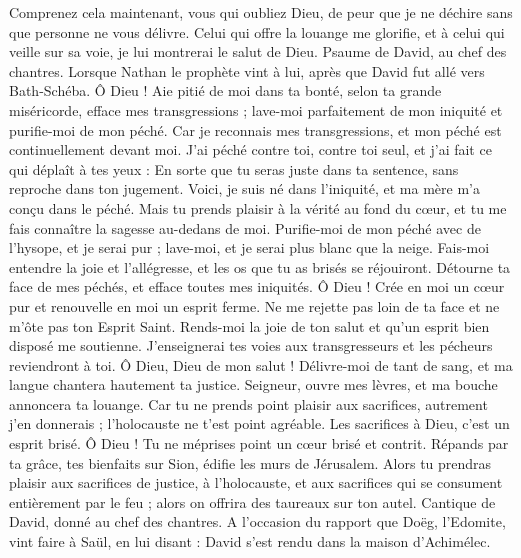 \begin{multicols}{2}
Comprenez cela maintenant, vous qui oubliez Dieu, de peur que je ne déchire sans que personne ne vous délivre.
Celui qui offre la louange me glorifie, et à celui qui veille sur sa voie, je lui montrerai le salut de Dieu.
\VerseOne{}Psaume de David, au chef des chantres.
Lorsque Nathan le prophète vint à lui, après que David fut allé vers Bath-Schéba.
Ô Dieu ! Aie pitié de moi dans ta bonté, selon ta grande miséricorde, efface mes transgressions ;
lave-moi parfaitement de mon iniquité et purifie-moi de mon péché.
Car je reconnais mes transgressions, et mon péché est continuellement devant moi.
J'ai péché contre toi, contre toi seul, et j'ai fait ce qui déplaît à tes yeux : En sorte que tu seras juste dans ta sentence, sans reproche dans ton jugement.
Voici, je suis né dans l'iniquité, et ma mère m'a conçu dans le péché.
Mais tu prends plaisir à la vérité au fond du cœur, et tu me fais connaître la sagesse au-dedans de moi.
Purifie-moi de mon péché avec de l'hysope, et je serai pur ; lave-moi, et je serai plus blanc que la neige.
Fais-moi entendre la joie et l'allégresse, et les os que tu as brisés se réjouiront.
Détourne ta face de mes péchés, et efface toutes mes iniquités.
Ô Dieu ! Crée en moi un cœur pur et renouvelle en moi un esprit ferme.
Ne me rejette pas loin de ta face et ne m'ôte pas ton Esprit Saint.
Rends-moi la joie de ton salut et qu’un esprit bien disposé me soutienne.
J'enseignerai tes voies aux transgresseurs et les pécheurs reviendront à toi.
Ô Dieu, Dieu de mon salut ! Délivre-moi de tant de sang, et ma langue chantera hautement ta justice.
Seigneur, ouvre mes lèvres, et ma bouche annoncera ta louange.
Car tu ne prends point plaisir aux sacrifices, autrement j'en donnerais ; l'holocauste ne t'est point agréable.
Les sacrifices à Dieu, c’est un esprit brisé. Ô Dieu ! Tu ne méprises point un cœur brisé et contrit.
Répands par ta grâce, tes bienfaits sur Sion, édifie les murs de Jérusalem.
Alors tu prendras plaisir aux sacrifices de justice, à l'holocauste, et aux sacrifices qui se consument entièrement par le feu ; alors on offrira des taureaux sur ton autel.
\VerseOne{}Cantique de David, donné au chef des chantres.
A l’occasion du rapport que Doëg, l’Edomite, vint faire à Saül, en lui disant : David s’est rendu dans la maison d’Achimélec.

\end{multicols}
